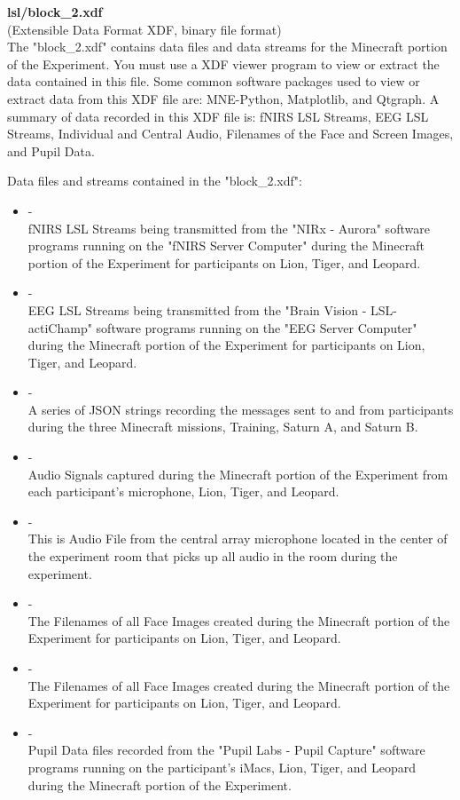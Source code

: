 \begin{description}
\medskip
\item\textbf{lsl/block\_2.xdf}\\(Extensible Data Format XDF, binary file format)\\
The "block\_2.xdf" contains data files and data streams for the Minecraft portion of the Experiment. You must use a XDF viewer program to view or extract the data contained in this file. Some common software packages used to view or extract data from this XDF file are: MNE-Python, Matplotlib, and Qtgraph. A summary of data recorded in this XDF file is: fNIRS LSL Streams, EEG LSL Streams, Individual and Central Audio, Filenames of the Face and Screen Images, and Pupil Data.

Data files and streams contained in the "block\_2.xdf":
\begin{itemize}
    \item {} -\\fNIRS LSL Streams being transmitted from the "NIRx - Aurora" software programs running on the "fNIRS Server Computer" during the Minecraft portion of the Experiment for participants on Lion, Tiger, and Leopard.
    \item {} -\\EEG LSL Streams being transmitted from the "Brain Vision - LSL-actiChamp" software programs running on the "EEG Server Computer" during the Minecraft portion of the Experiment for participants on Lion, Tiger, and Leopard.
    \item {} -\\A series of JSON strings recording the messages sent to and from participants during the three Minecraft missions, Training, Saturn A, and Saturn B.
    \item {} -\\Audio Signals captured during the Minecraft portion of the Experiment from each participant's microphone, Lion, Tiger, and Leopard.
    \item {} -\\This is Audio File from the central array microphone located in the center of the experiment room that picks up all audio in the room during the experiment.
    \item {} -\\The Filenames of all Face Images created during the Minecraft portion of the Experiment for participants on Lion, Tiger, and Leopard.
    \item {} -\\The Filenames of all Face Images created during the Minecraft portion of the Experiment for participants on Lion, Tiger, and Leopard.
    \item {} -\\Pupil Data files recorded from the "Pupil Labs - Pupil Capture" software programs running on the participant's iMacs, Lion, Tiger, and Leopard during the Minecraft portion of the Experiment.
\end{itemize}


\end{description}
